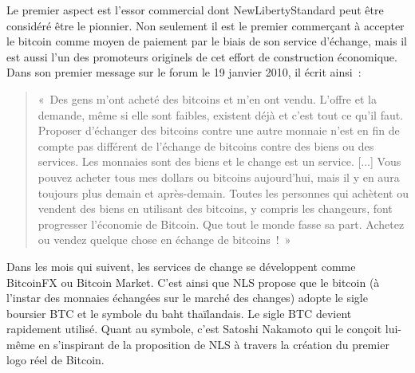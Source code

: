 
Le premier aspect est l'essor commercial dont NewLibertyStandard peut être considéré être le pionnier. Non seulement il est le premier commerçant à accepter le bitcoin comme moyen de paiement par le biais de son service d'échange, mais il est aussi l'un des promoteurs originels de cet effort de construction économique. Dans son premier message sur le forum le 19 janvier 2010, il écrit ainsi~:

\begin{quote}
«~Des gens m'ont acheté des bitcoins et m'en ont vendu. L'offre et la demande, même si elle sont faibles, existent déjà et c'est tout ce qu'il faut. Proposer d'échanger des bitcoins contre une autre monnaie n'est en fin de compte pas différent de l'échange de bitcoins contre des biens ou des services. Les monnaies sont des biens et le change est un service. [...] Vous pouvez acheter tous mes dollars ou bitcoins aujourd'hui, mais il y en aura toujours plus demain et après-demain. Toutes les personnes qui achètent ou vendent des biens en utilisant des bitcoins, y compris les changeurs, font progresser l'économie de Bitcoin. Que tout le monde fasse sa part. Achetez ou vendez quelque chose en échange de bitcoins~!~»
\end{quote}


Dans les mois qui suivent, les services de change se développent comme BitcoinFX ou Bitcoin Market. C'est ainsi que NLS propose que le bitcoin (à l'instar des monnaies échangées sur le marché des changes) adopte le sigle boursier BTC et le symbole du baht thaïlandais. Le sigle BTC devient rapidement utilisé. Quant au symbole, c'est Satoshi Nakamoto qui le conçoit lui-même en s'inspirant de la proposition de NLS à travers la création du premier logo réel de Bitcoin.

